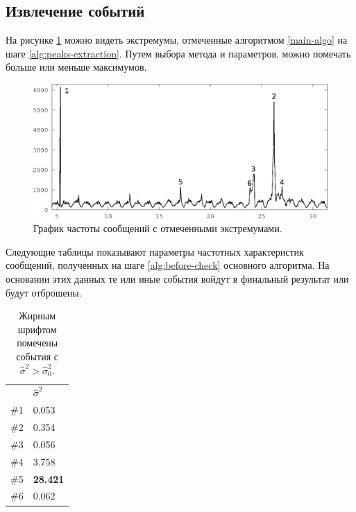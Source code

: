 \documentclass[12pt, a4paper]{article}
\newcommand\todo[1]{\marginpar{\textcolor{red}{#1}}}
\begin{document}
  \subsection{Извлечение событий}
  
	На рисунке \ref{fig:all-freq-labeled} можно видеть экстремумы, отмеченные алгоритмом \ref{main-algo} на шаге \ref{alg:peaks-extraction}. Путем выбора метода и параметров, можно помечать больше или меньше максимумов. 

	 \begin{figure}[H]
	  \centering
	  \includegraphics[width=15cm]{all-freq-labeled-1.eps}
	  \caption{График частоты сообщений с отмеченными экстремумами.}
	  \label{fig:all-freq-labeled}
	  \end{figure}
	  
	Следующие таблицы показывают параметры частотных характеристик сообщений, полученных на шаге \ref{alg:before-check} основного алгоритма. На основании этих данных те или иные события войдут в финальный результат или будут отброшены.
	
	\begin{table}[H]
	\centering
	\begin{tabular}{l | l}
	& $\hat{\sigma}^2$ \\ 
	\#1 & 0.053 \\ 
	\#2 & 0.354 \\ 
	\#3 & 0.056 \\ 
	\#4 & 3.758 \\ 
	\#5 & \textbf{28.421} \\ 
	\#6 & 0.062 \\ 
	\end{tabular}
	\caption{Жирным шрифтом помечены события с $\hat{\sigma}^2>\hat{\sigma}_0^2$.}
	\label{sd-table}
	\end{table}
	
	
\end{document}
